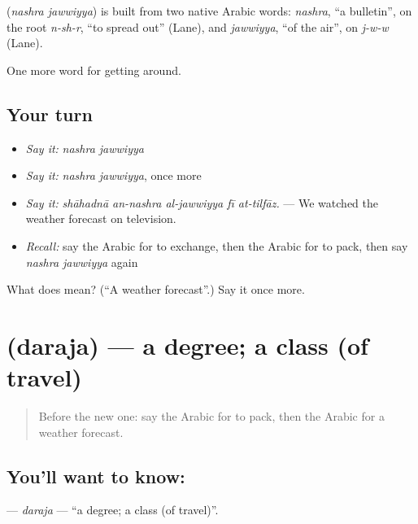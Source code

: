 \begin{cousinweb}
\textbf{ } (\emph{nashra jawwiyya}) is built from two native Arabic words: \emph{nashra}, \textquotedblleft{}a bulletin\textquotedblright{}, on the root \emph{n-sh-r}, \textquotedblleft{}to spread out\textquotedblright{} (Lane), and \emph{jawwiyya}, \textquotedblleft{}of the air\textquotedblright{}, on \emph{j-w-w} (Lane).
\end{cousinweb}

\begin{grammarlens}[title={What you've built}]
One more word for getting around.
\end{grammarlens}

\subsection*{Your turn}
\begin{itemize}
\raggedright
  \item \emph{Say it:} \emph{nashra jawwiyya}
  \item \emph{Say it:} \emph{nashra jawwiyya}, once more
  \item \emph{Say it:} \emph{shāhadnā an-nashra al-jawwiyya fī at-tilfāz.} — We watched the weather forecast on television.
  \item \emph{Recall:} say the Arabic for to exchange, then the Arabic for to pack, then say \emph{nashra jawwiyya} again
\end{itemize}

\begin{tcolorbox}[breakable,colback=teal!4,colframe=teal!35!black,title={Before you move on}]
What does   mean? (\textquotedblleft{}A weather forecast\textquotedblright{}.) Say it once more.
\end{tcolorbox}
\section[\texorpdfstring{\ar{درجة} (daraja)}{درجة (daraja)}]{ (daraja) — a degree; a class (of travel)}

\label{lesson:AR-C480-daraja}



\begin{quote}
Before the new one: say the Arabic for to pack, then the Arabic for a weather forecast.
\end{quote}

\subsection*{You'll want to know: }
\textbf{} — \emph{daraja} — \textquotedblleft{}a degree; a class (of travel)\textquotedblright{}.

